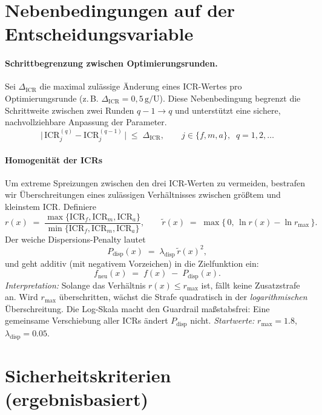 \documentclass[ngerman,a4paper,12pt,pdftex]{article}
\newcommand{\ICR}{\mathrm{ICR}}
\newcommand{\ICRf}{\mathrm{ICR}_f}
\newcommand{\ICRm}{\mathrm{ICR}_m}
\newcommand{\ICRa}{\mathrm{ICR}_a}
\newcommand{\DICR}{\Delta_{\mathrm{ICR}}}
\newcommand{\rmax}{r_{\max}}
\newcommand{\lambdadisp}{\lambda_{\mathrm{disp}}}
\begin{document}
\section{Nebenbedingungen auf der Entscheidungsvariable}


\paragraph{Schrittbegrenzung zwischen Optimierungsrunden.} Sei \(\DICR\) die maximal zulässige Änderung eines \(\ICR\)-Wertes pro Optimierungsrunde (z.\,B. \(\DICR=0{,}5\,\mathrm{g}/\mathrm{U}\)). Diese Nebenbedingung begrenzt die Schrittweite zwischen zwei Runden \(q-1 \to q\) und unterstützt eine sichere, nachvollziehbare Anpassung der Parameter.
\[
\bigl|\,\ICR_j^{(q)} - \ICR_j^{(q-1)}\,\bigr| \;\le\; \DICR,
\qquad j \in \{f,m,a\},\;\; q=1,2,\dots
\]

\medskip

\paragraph{Homogenität der ICRs}
Um extreme Spreizungen zwischen den drei ICR-Werten zu vermeiden, bestrafen wir
Überschreitungen eines zulässigen Verhältnisses zwischen größtem und kleinstem ICR.
Definiere
\[
r(x)\;=\;\frac{\max\{\ICRf,\ICRm,\ICRa\}}{\min\{\ICRf,\ICRm,\ICRa\}},
\qquad
\tilde r(x)\;=\;\max\{\,0,\,\ln r(x)-\ln \rmax\,\}.
\]
Der weiche Dispersions-Penalty lautet
\[
P_{\mathrm{disp}}(x)\;=\;\lambdadisp\,\tilde r(x)^{2},
\]
und geht additiv (mit negativem Vorzeichen) in die Zielfunktion ein:
\[
f_{\text{neu}}(x)\;=\;f(x)\;-\;P_{\mathrm{disp}}(x).
\]
\noindent
\textit{Interpretation:} Solange das Verhältnis \(r(x)\le\rmax\) ist, fällt keine Zusatzstrafe an.
Wird \(\rmax\) überschritten, wächst die Strafe quadratisch in der \emph{logarithmischen} Überschreitung.
Die Log-Skala macht den Guardrail maßstabsfrei: Eine gemeinsame Verschiebung aller ICRs
ändert \(P_{\mathrm{disp}}\) nicht. \textit{Startwerte:} \(\rmax=1.8\), \(\lambdadisp=0.05\).

\section{Sicherheitskriterien (ergebnisbasiert)}
\end{document}
